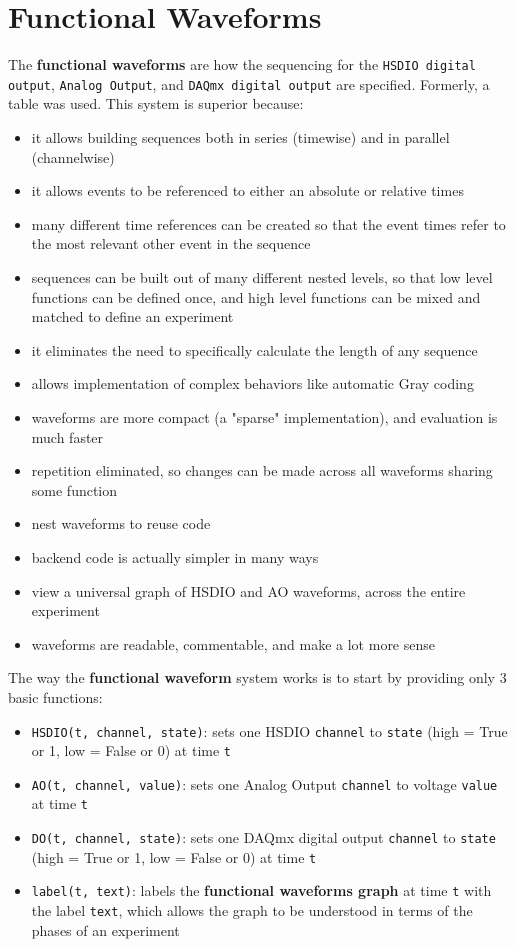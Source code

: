 \documentclass[pdftex,11pt,letterpaper]{article}
\begin{document}
\section{Functional Waveforms}

The \textbf{functional waveforms} are how the sequencing for the \texttt{HSDIO digital output}, \texttt{Analog Output}, and \texttt{DAQmx digital output} are specified.  Formerly, a table was used.  This system is superior because:

\begin{itemize}
\item it allows building sequences both in series (timewise) and in parallel (channelwise)
\item it allows events to be referenced to either an absolute or relative times
\item many different time references can be created so that the event times refer to the most relevant other event in the sequence
\item sequences can be built out of many different nested levels, so that low level functions can be defined once, and high level functions can be mixed and matched to define an experiment
\item it eliminates the need to specifically calculate the length of any sequence
\item allows implementation of complex behaviors like automatic Gray coding
\item waveforms are more compact (a "sparse" implementation), and evaluation is much faster
\item repetition eliminated, so changes can be made across all waveforms sharing some function
\item nest waveforms to reuse code
\item backend code is actually simpler in many ways
\item view a universal graph of HSDIO and AO waveforms, across the entire experiment
\item waveforms are readable, commentable, and make a lot more sense
\end{itemize}

The way the \textbf{functional waveform} system works is to start by providing only 3 basic functions:

\begin{itemize}
\item \texttt{HSDIO(t, channel, state)}: sets one HSDIO \texttt{channel} to \texttt{state} (high = True or 1, low = False or 0) at time \texttt{t}
\item \texttt{AO(t, channel, value)}: sets one Analog Output \texttt{channel} to voltage \texttt{value} at time \texttt{t}
\item \texttt{DO(t, channel, state)}: sets one DAQmx digital output \texttt{channel} to \texttt{state} (high = True or 1, low = False or 0) at time \texttt{t}
\item \texttt{label(t, text)}: labels the \textbf{functional waveforms graph} at time \texttt{t} with the label \texttt{text}, which allows the graph to be understood in terms of the phases of an experiment
\end{itemize}
\end{document}
